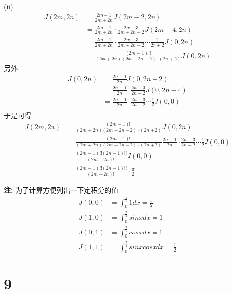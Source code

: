 \documentclass{article}
\begin{document}
(ii)
\begin{align*}
  J(2m, 2n) & = \frac{2m - 1}{2m + 2n} J(2m - 2, 2n)                                                     \\
            & = \frac{2m - 1}{2m + 2n} \cdot \frac{2m - 3}{2m + 2n - 2} J(2m - 4, 2n)                    \\
            & = \frac{2m - 1}{2m + 2n} \cdot \frac{2m - 3}{2m + 2n - 2} \cdots \frac{1}{2n + 2} J(0, 2n) \\
            & = \frac{(2m - 1)!!}{(2m + 2n)(2m + 2n - 2)\cdot(2n + 2)} J(0, 2n)
\end{align*}
另外
\begin{align*}
  J(0, 2n) & = \frac{2n - 1}{2n} J(0, 2n - 2)                                           \\
           & = \frac{2n - 1}{2n} \cdot \frac{2n - 3}{2n - 2} J(0, 2n - 4)               \\
           & = \frac{2n - 1}{2n} \cdot \frac{2n - 3}{2n - 2} \cdots \frac{1}{2} J(0, 0) \\
\end{align*}
于是可得
\begin{align*}
  J(2m, 2n) & = \frac{(2m - 1)!!}{(2m + 2n)(2m + 2n - 2)\cdot(2n + 2)} J(0, 2n)                                                                 \\
            & = \frac{(2m - 1)!!}{(2m + 2n)(2m + 2n - 2)\cdot(2n + 2)} \frac{2n - 1}{2n} \cdot \frac{2n - 3}{2n - 2} \cdots \frac{1}{2} J(0, 0) \\
            & = \frac{(2m - 1)!!(2n - 1)!!}{(2m + 2n)!!}J(0, 0)                                                                                 \\
            & = \frac{(2m - 1)!!(2n - 1)!!}{(2m + 2n)!!} \cdot \frac{\pi}{2}
\end{align*}

\textbf{注: } 为了计算方便列出一下定积分的值
\begin{align*}
  J(0, 0) & = \int_{0}^{\frac{\pi}{2}} 1 dx = \frac{\pi}{2}        \\
  J(1, 0) & = \int_{0}^{\frac{\pi}{2}} sin x dx = 1                \\
  J(0, 1) & = \int_{0}^{\frac{\pi}{2}} cos x dx = 1                \\
  J(1, 1) & = \int_{0}^{\frac{\pi}{2}} sinx cos x dx = \frac{1}{2}
\end{align*}



\section*{9}
\end{document}
